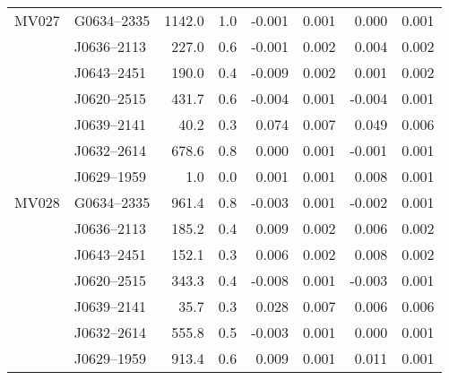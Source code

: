 \begin{table}[h]
\begin{tabular}{llrrrrrr}
		MV027       & G0634--2335 & 1142.0  &  1.0   &  -0.001  &  0.001  &  0.000  &  0.001 \\
		& J0636--2113 &  227.0  &  0.6   &  -0.001  &  0.002  &  0.004  &  0.002 \\
		& J0643--2451 &  190.0  &  0.4   &  -0.009  &  0.002  &  0.001  &  0.002 \\
		& J0620--2515 &  431.7  &  0.6   &  -0.004  &  0.001  & -0.004  &  0.001 \\
		& J0639--2141 &   40.2  &  0.3   &   0.074  &  0.007  &  0.049  &  0.006 \\
		& J0632--2614 &  678.6  &  0.8   &   0.000  &  0.001  & -0.001  &  0.001 \\
		& J0629--1959 &    1.0  &  0.0   &   0.001  &  0.001  &  0.008  &  0.001 \\ \hline
		MV028 		& G0634--2335 &  961.4  &  0.8   &  -0.003  &  0.001  & -0.002  &  0.001 \\
		& J0636--2113 &  185.2  &  0.4   &   0.009  &  0.002  &  0.006  &  0.002 \\
		& J0643--2451 &  152.1  &  0.3   &   0.006  &  0.002  &  0.008  &  0.002 \\
		& J0620--2515 &  343.3  &  0.4   &  -0.008  &  0.001  & -0.003  &  0.001 \\
		& J0639--2141 &   35.7  &  0.3   &   0.028  &  0.007  &  0.006  &  0.006 \\
		& J0632--2614 &  555.8  &  0.5   &  -0.003  &  0.001  &  0.000  &  0.001 \\
		& J0629--1959 &  913.4  &  0.6   &   0.009  &  0.001  &  0.011  &  0.001 \\ \bottomrule
	\end{tabular}
\end{table}


\afterpage{\blankpage}



